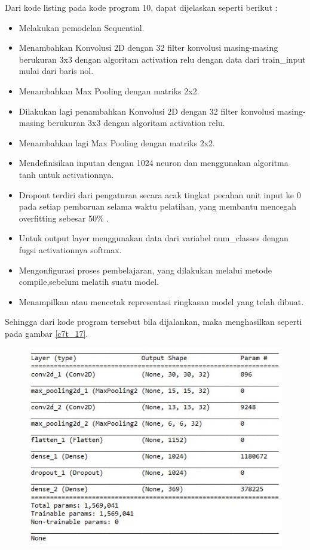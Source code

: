 \begin{enumerate}
\par Dari kode listing pada kode program 10, dapat dijelaskan seperti berikut :
\begin{itemize}
\item Melakukan pemodelan Sequential.
\item Menambahkan Konvolusi 2D dengan 32 filter konvolusi masing-masing berukuran 3x3 dengan algoritam activation relu dengan data dari train\_input mulai dari baris nol.
\item Menambahkan Max Pooling dengan matriks 2x2.
\item Dilakukan lagi penambahkan Konvolusi 2D dengan 32 filter konvolusi masing-masing berukuran 3x3 dengan algoritam activation relu.
\item Menambahkan lagi Max Pooling dengan matriks 2x2.
\item Mendefinisikan inputan dengan 1024 neuron dan menggunakan algoritma tanh untuk activationnya.
\item Dropout terdiri dari pengaturan secara acak tingkat pecahan unit input ke 0 pada setiap pembaruan selama waktu pelatihan, yang membantu mencegah overfitting sebesar 50\% .
\item Untuk output layer menggunakan data dari variabel num\_classes dengan fugsi activationnya softmax.
\item Mengonfigurasi proses pembelajaran, yang dilakukan melalui metode compile,sebelum melatih suatu model.
\item Menampilkan atau mencetak representasi ringkasan model yang telah dibuat.
\end{itemize}
\par Sehingga dari kode program tersebut bila dijalankan, maka menghasilkan seperti pada gambar \ref{c7t_17}.
\begin{figure}[!htbp]
\centerline{\includegraphics[width=1\textwidth]{figures/c7t/17.JPG}}

\end{figure}
\end{enumerate}

